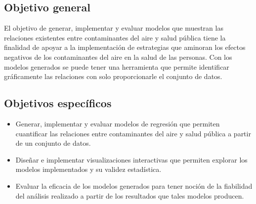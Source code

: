 \subsection{Objetivo general}
El objetivo de generar, implementar y evaluar modelos que muestran las relaciones existentes entre contaminantes del aire y salud pública tiene la finalidad de apoyar a la implementación de estrategias que aminoran los efectos negativos de los contaminantes del aire en la salud de las personas. Con los modelos generados se puede tener una herramienta que permite identificar gráficamente las relaciones con solo proporcionarle el conjunto de datos.

\subsection{Objetivos específicos}
\begin{itemize}
\item Generar, implementar y evaluar modelos de regresión que permiten cuantificar las relaciones entre contaminantes del aire y salud pública a partir de un conjunto de datos.
\end{itemize}
\begin{itemize}
\item Diseñar e implementar visualizaciones interactivas que permiten explorar los modelos implementados y su validez estadística.
\end{itemize}
\begin{itemize}
\item Evaluar la eficacia de los modelos generados para tener noción de la fiabilidad del análisis realizado a partir de los resultados que tales modelos producen.
\end{itemize}

